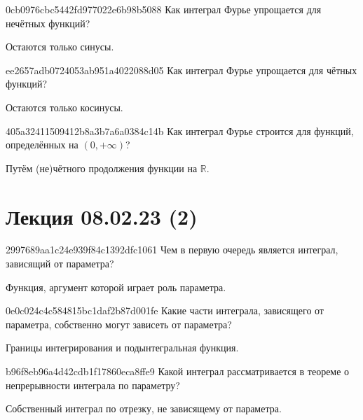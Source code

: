 \begin{note}{0cb0976cbc5442fd977022e6b98b5088}
    Как интеграл Фурье упрощается для нечётных функций?

    \begin{cloze}{1}
        Остаются только синусы.
    \end{cloze}
\end{note}

\begin{note}{ee2657adb0724053ab951a4022088d05}
    Как интеграл Фурье упрощается для чётных функций?

    \begin{cloze}{1}
        Остаются только косинусы.
    \end{cloze}
\end{note}

\begin{note}{405a32411509412b8a3b7a6a0384c14b}
    Как интеграл Фурье строится для функций, определённых на \({ (0, +\infty) }\)?

    \begin{cloze}{1}
        Путём (не)чётного продолжения функции на \({ \mathbb R }\).
    \end{cloze}
\end{note}

\section{Лекция 08.02.23 (2)}
\begin{note}{2997689aa1c24e939f84c1392dfc1061}
    Чем в первую очередь является интеграл, зависящий от параметра?

    \begin{cloze}{1}
        Функция, аргумент которой играет роль параметра.
    \end{cloze}
\end{note}

\begin{note}{0e0c024c4c584815bc1daf2b87d001fe}
    Какие части интеграла, зависящего от параметра, собственно могут зависеть от параметра?

    \begin{cloze}{1}
        Границы интегрирования и подынтегральная функция.
    \end{cloze}
\end{note}

\begin{note}{b96f8eb96a4d42cdb1f17860eca8ffe9}
    Какой интеграл рассматривается в теореме о непрерывности интеграла по параметру?

    \begin{cloze}{1}
        Собственный интеграл по отрезку, не зависящему от параметра.
    \end{cloze}
\end{note}


